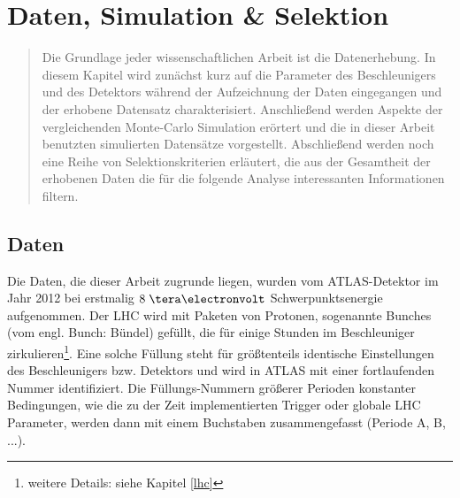 


\chapter{Daten, Simulation \texorpdfstring{\&}{und} Selektion}

\begin{quote}
    Die Grundlage jeder wissenschaftlichen Arbeit ist die Datenerhebung. In
    diesem Kapitel wird zunächst kurz auf die Parameter des Beschleunigers und
    des Detektors während der Aufzeichnung der Daten eingegangen und der
    erhobene Datensatz charakterisiert. Anschließend werden Aspekte der
    vergleichenden Monte-Carlo Simulation erörtert und die in dieser Arbeit
    benutzten simulierten Datensätze vorgestellt. Abschließend werden noch eine
    Reihe von Selektionskriterien erläutert, die aus der Gesamtheit der
    erhobenen Daten die für die folgende Analyse interessanten Informationen
    filtern.
\end{quote}



\section{Daten}
\label{data_sim_selection:data}


Die Daten, die dieser Arbeit zugrunde liegen, wurden vom ATLAS-Detektor im Jahr
2012 bei erstmalig $8 \TeV$ Schwerpunktsenergie aufgenommen. Der \ac{LHC} wird
mit Paketen von Protonen, sogenannte Bunches (vom engl. Bunch: Bündel) gefüllt,
die für einige Stunden im Beschleuniger zirkulieren\footnote{weitere Details:
siehe Kapitel \ref{lhc}}. Eine solche Füllung steht für größtenteils identische
Einstellungen des Beschleunigers bzw. Detektors und wird in ATLAS mit einer
fortlaufenden Nummer identifiziert. Die Füllungs-Nummern größerer Perioden
konstanter Bedingungen, wie die zu der Zeit implementierten Trigger oder
globale \ac{LHC} Parameter, werden dann mit einem Buchstaben zusammengefasst
(Periode A, B, ...).

